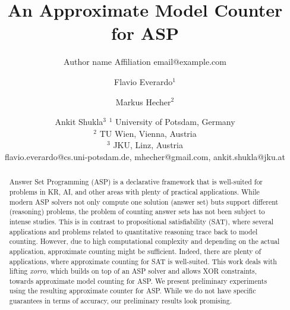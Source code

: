 \documentclass{article}
\title{An Approximate Model Counter for ASP}
\author{%
    Author name
    \affiliations
    Affiliation
    \emails
    email@example.com    %
}
\author{%
Flavio Everardo$^1$\and
Markus Hecher$^2$\and
Ankit Shukla$^{3}$
\affiliations
$^1$ University of Potsdam, Germany\\
$^2$ TU Wien, Vienna, Austria\\
$^3$ JKU, Linz, Austria\\
\emails
flavio.everardo@cs.uni-potsdam.de,
mhecher@gmail.com,
ankit.shukla@jku.at
}
\newcommand{\sysfont}{\textit}
\newcommand{\xorro}{\sysfont{xorro}}
\begin{document}
\maketitle

\begin{abstract}
Answer Set Programming (ASP) is a declarative framework that is well-suited for problems in KR, AI, and other areas with plenty of practical applications.
While modern ASP solvers not only compute one solution (answer set) buts support different (reasoning) problems, the problem of counting answer sets has not been subject to intense studies.
This is in contrast to propositional satisfiability (SAT), where several applications and problems related to quantitative reasoning trace back to model counting. However, due to high computational complexity and depending on the actual application, approximate counting might be sufficient. Indeed, there are plenty of applications, where approximate counting for SAT is well-suited. This work deals with lifting \xorro{}, which builds on top of an ASP solver and allows XOR constraints, towards approximate model counting for ASP. We present preliminary experiments using the resulting approximate counter for ASP. %
While we do not have specific guarantees in terms of accuracy, our preliminary results look promising.
\end{abstract}

\end{document}
